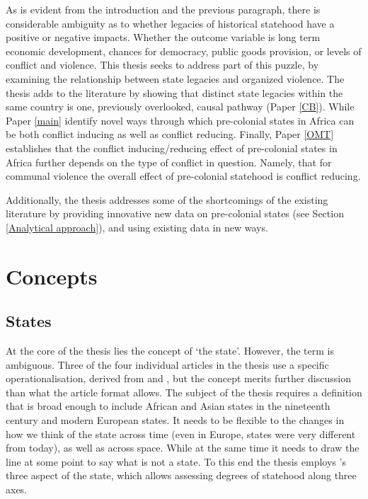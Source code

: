 As is evident from the introduction and the previous paragraph, there is
considerable ambiguity as to whether legacies of historical statehood have a
positive or negative impacts. Whether the outcome variable is long term economic
development, chances for democracy, public goods provision, or levels of
conflict and violence. This thesis seeks to address part of this puzzle, by
examining the relationship between state legacies and organized violence. The
thesis adds to the literature by showing that \citet{multiple} distinct state
legacies within the same country is one, previously overlooked, causal pathway
(Paper \ref{CB}). While Paper \ref{main} identify novel ways through which
pre-colonial states in Africa can be both conflict inducing as well as conflict
reducing. Finally, Paper \ref{OMT} establishes that the conflict
inducing/reducing effect of pre-colonial states in Africa further depends on the
type of conflict in question. Namely, that for communal violence the overall
effect of pre-colonial statehood is conflict reducing.

Additionally, the thesis addresses some of the shortcomings of the existing
literature by providing innovative new data on pre-colonial states (see Section
\ref{Analytical approach}), and using existing data in new ways.




\section{Concepts} \label{Concepts}

\subsection{States} \label{States}

At the core of the thesis lies the concept of `the state'. However, the term is
ambiguous. Three of the four individual articles in the thesis use a specific
operationalisation, derived from \citet{Butcher2019} and \citet{Butcher2017},
but the concept merits further discussion than what the article format allows.
The subject of the thesis requires a definition that is broad enough to include
African and Asian states in the nineteenth century and modern European states.
It needs to be flexible to the changes in how we think of the state across time
(even in Europe, states were very different from today), as well as across
space. While at the same time it needs to draw the line at some point to say
what is not a state. To this end the thesis employs \citet{Clapham1996}'s three
aspect of the state, which allows assessing degrees of statehood along three
axes.

